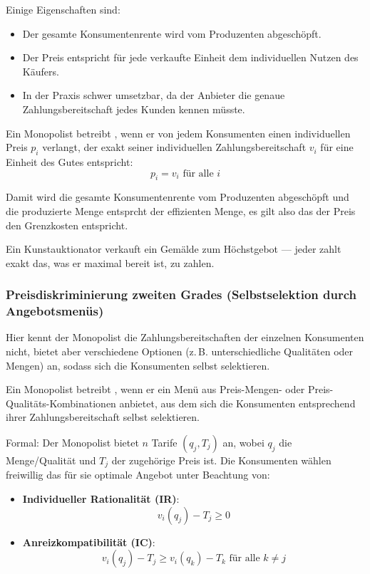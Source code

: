 Einige Eigenschaften sind:
\begin{itemize}
    \item Der gesamte Konsumentenrente wird vom Produzenten abgeschöpft.
    \item Der Preis entspricht für jede verkaufte Einheit dem individuellen Nutzen des Käufers.
    \item In der Praxis schwer umsetzbar, da der Anbieter die genaue Zahlungsbereitschaft jedes Kunden kennen müsste.
\end{itemize}



\begin{definition}
Ein Monopolist betreibt , wenn er von jedem Konsumenten einen individuellen Preis $p_i$ verlangt, der exakt seiner individuellen Zahlungsbereitschaft $v_i$ für eine Einheit des Gutes entspricht:
\[
p_i = v_i \text{ für alle } i
\]
\end{definition}

Damit wird die gesamte Konsumentenrente vom Produzenten abgeschöpft und die produzierte Menge entsprcht der effizienten Menge, es gilt also das der Preis den Grenzkosten entspricht. 


\begin{example}
Ein Kunstauktionator verkauft ein Gemälde zum Höchstgebot — jeder zahlt exakt das, was er maximal bereit ist, zu zahlen.
\end{example}



\subsubsection{Preisdiskriminierung zweiten Grades (Selbstselektion durch Angebotsmenüs)}

Hier kennt der Monopolist die Zahlungsbereitschaften der einzelnen Konsumenten nicht, bietet aber verschiedene Optionen (z.\,B. unterschiedliche Qualitäten oder Mengen) an, sodass sich die Konsumenten selbst selektieren.

\begin{definition}
Ein Monopolist betreibt , wenn er ein Menü aus Preis-Mengen- oder Preis-Qualitäts-Kombinationen anbietet, aus dem sich die Konsumenten entsprechend ihrer Zahlungsbereitschaft selbst selektieren.

Formal:
Der Monopolist bietet $n$ Tarife $(q_j, T_j)$ an, wobei $q_j$ die Menge/Qualität und $T_j$ der zugehörige Preis ist. Die Konsumenten wählen freiwillig das für sie optimale Angebot unter Beachtung von:

\begin{itemize}
    \item \textbf{Individueller Rationalität (IR)}: 
    \[
    v_i(q_j) - T_j \geq 0
    \]
    \item \textbf{Anreizkompatibilität (IC)}:
    \[
    v_i(q_j) - T_j \geq v_i(q_k) - T_k \text{ für alle } k \neq j
    \]
\end{itemize}
\end{definition}

